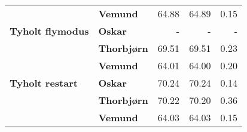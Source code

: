 \begin{table}[]
\begin{tabular}{llrrr}
                                            & \textbf{Vemund}                      & 64.88                                                                       & 64.89                                                                 & 0.15                                                                         \\
    \textbf{Tyholt flymodus}                & \textbf{Oskar}                       & -                                                                           & -                                                                     & -                                                                            \\
                                            & \textbf{Thorbjørn}                   & 69.51                                                                       & 69.51                                                                 & 0.23                                                                         \\
                                            & \textbf{Vemund}                      & 64.01                                                                       & 64.00                                                                 & 0.20                                                                         \\
    \rowcolor[HTML]{C0C0C0} 
    \textbf{Tyholt restart}                 & \textbf{Oskar}                       & 70.24                                                                       & 70.24                                                                 & 0.14                                                                         \\
    \rowcolor[HTML]{C0C0C0} 
                                            & \textbf{Thorbjørn}                   & 70.22                                                                       & 70.20                                                                 & 0.36                                                                         \\
    \rowcolor[HTML]{C0C0C0} 
                                            & \textbf{Vemund}                      & 64.03                                                                       & 64.03                                                                 & 0.15                                                                        
    \end{tabular}
\end{table}
